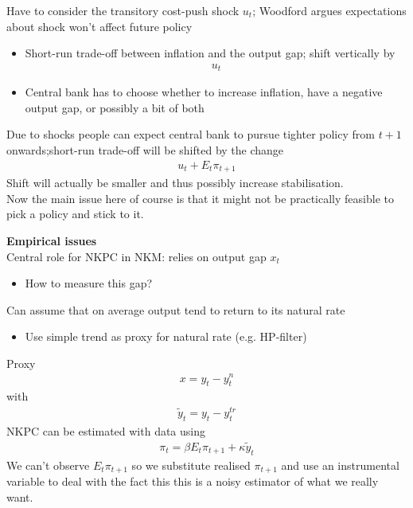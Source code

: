 \documentclass{beamer}
\begin{document}
\begin{frame}
  Have to consider the transitory cost-push shock $u_t$; Woodford argues expectations about shock won't affect future policy
  \begin{itemize}
    \item Short-run trade-off between inflation and the output gap; shift vertically by
    \begin{align}
       u_t
     \end{align} 
    \item Central bank has to choose whether to increase inflation, have a negative output gap, or possibly a bit of both
  \end{itemize}
  Due to shocks people can expect central bank to pursue tighter policy from $t+1$ onwards;short-run trade-off will be shifted by the change 
  \begin{align}
   u_t+E_t\pi_{t+1} 
  \end{align}
  Shift will actually be smaller and thus possibly increase stabilisation. \\
Now the main issue here of course is that it might not be practically feasible to pick a policy and stick to it.   
\end{frame}

\begin{frame}
  \textbf{Empirical issues}\\
  Central role for NKPC in NKM: relies on output gap $x_t$
  \begin{itemize}
    \item How to measure this gap?
  \end{itemize}
 Can assume that on average output tend to return to its natural rate
 \begin{itemize}
   \item Use simple trend as proxy for natural rate (e.g. HP-filter)
 \end{itemize}
\end{frame}

\begin{frame}
 Proxy
 \begin{align}
  x=y_t-y_t^n
 \end{align}
 with
\begin{align}
  \tilde{y}_t=y_t-y_t^{tr}
\end{align}
 NKPC can be estimated with data using
\begin{align}
  \pi_t = \beta E_t \pi_{t+1} + \kappa\tilde{y}_t
\end{align}
We can't observe $E_t \pi_{t+1}$ so we substitute realised $\pi_{t+1}$ and use an instrumental variable to deal with the fact this this is a noisy estimator of what we really want.
\end{frame}
\end{document}
